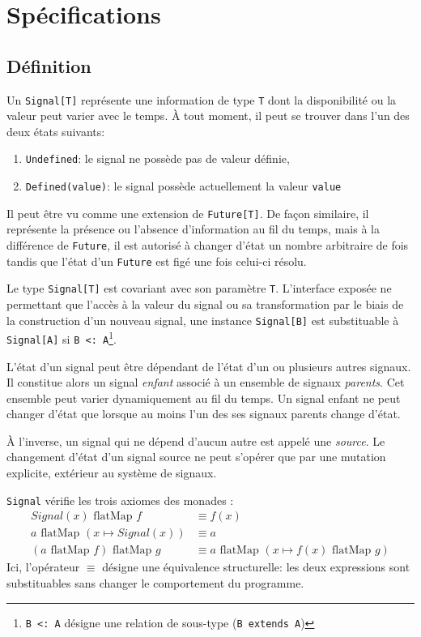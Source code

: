 \section{Spécifications}

\subsection{Définition}
Un \texttt{Signal[T]} représente une information de type \texttt{T} dont la disponibilité ou la valeur peut varier avec le temps. À tout moment, il peut se trouver dans l'un des deux états suivants:
\begin{enumerate}
	\item \texttt{Undefined}: le signal ne possède pas de valeur définie,
	\item \texttt{Defined(value)}: le signal possède actuellement la valeur \texttt{value}
\end{enumerate}

Il peut être vu comme une extension de \texttt{Future[T]}. De façon similaire, il représente la présence ou l'absence d'information au fil du temps, mais à la différence de \texttt{Future}, il est autorisé à changer d'état un nombre arbitraire de fois tandis que l'état d'un \texttt{Future} est figé une fois celui-ci résolu.

Le type \texttt{Signal[T]} est covariant avec son paramètre \texttt{T}. L'interface exposée ne permettant que l'accès à la valeur du signal ou sa transformation par le biais de la construction d'un nouveau signal, une instance \texttt{Signal[B]} est substituable à \texttt{Signal[A]} si \texttt{B <: A}\footnote{\texttt{B <: A} désigne une relation de sous-type (\texttt{B extends A})}.

L'état d'un signal peut être dépendant de l'état d'un ou plusieurs autres signaux. Il constitue alors un signal \emph{enfant} associé à un ensemble de signaux \emph{parents}. Cet ensemble peut varier dynamiquement au fil du temps. Un signal enfant ne peut changer d'état que lorsque au moins l'un des ses signaux parents change d'état.

À l'inverse, un signal qui ne dépend d'aucun autre est appelé une \emph{source}. Le changement d'état d'un signal source ne peut s'opérer que par une mutation explicite, extérieur au système de signaux.

\texttt{Signal} vérifie les trois axiomes des monades \cite{haskell-monad-laws}:
\begin{align*}
Signal(x) \text{ flatMap } f &\equiv f(x) \\
a \text{ flatMap } (x \mapsto Signal(x)) &\equiv a \\
(a \text{ flatMap } f)  \text{ flatMap } g &\equiv
a \text{ flatMap } (x \mapsto f(x)  \text{ flatMap } g) 
\end{align*}
Ici, l'opérateur $\equiv$ désigne une équivalence structurelle: les deux expressions sont substituables sans changer le comportement du programme.

